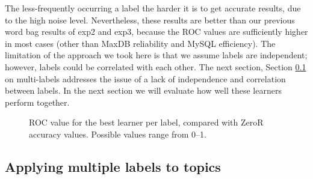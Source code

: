 \documentclass[]{sig-alternate}
\begin{document}
The less-frequently occurring a label the harder it is to get accurate
results, due to the high noise level. Nevertheless, these results are
better than our previous word bag results of \textsf{exp2} and
\textsf{exp3}, because the ROC values are sufficiently higher in most
cases (other than MaxDB reliability and MySQL efficiency). The
limitation of the approach we took here is that we assume labels are
independent; however, labels could be correlated with each other. 
The next section, Section \ref{sec:multilabel} on multi-labels
addresses the issue of a lack of independence and correlation between labels.
In the next section we will evaluate how well these learners perform
together.



\begin{figure}[ht]
\centering
{}
\label{fig:best-learn-per-tag}
\caption[]{ROC value for the best learner per label, compared with ZeroR accuracy values.  Possible values range from 0--1.
}
\end{figure}

\subsection{Applying multiple labels to topics}
\label{sec:multilabel}
\end{document}
